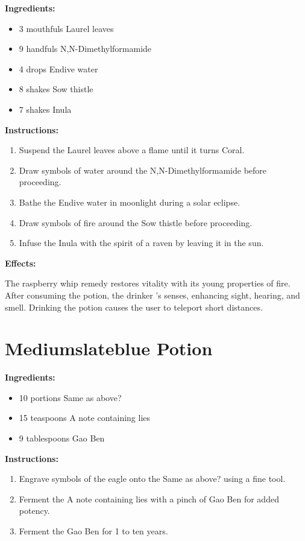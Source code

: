 \documentclass{article}
\begin{document}
\textbf{Ingredients:}

\begin{itemize}
  \item 3 mouthfuls Laurel leaves
  \item 9 handfuls N,N-Dimethylformamide
  \item 4 drops Endive water
  \item 8 shakes Sow thistle
  \item 7 shakes Inula
\end{itemize}

\textbf{Instructions:}

\begin{enumerate}
  \item Suspend the Laurel leaves above a flame until it turns Coral.
  \item Draw symbols of water around the N,N-Dimethylformamide before proceeding.
  \item Bathe the Endive water in moonlight during a solar eclipse.
  \item Draw symbols of fire around the Sow thistle before proceeding.
  \item Infuse the Inula with the spirit of a raven by leaving it in the sun.
\end{enumerate}

\textbf{Effects:}

The raspberry whip remedy restores vitality with its young properties of fire. After consuming the potion, the drinker 's senses, enhancing sight, hearing, and smell. Drinking the potion causes the user to teleport short distances.

\newpage
\section*{Mediumslateblue Potion}

\textbf{Ingredients:}

\begin{itemize}
  \item 10 portions Same as above?
  \item 15 teaspoons A note containing lies
  \item 9 tablespoons Gao Ben
\end{itemize}

\textbf{Instructions:}

\begin{enumerate}
  \item Engrave symbols of the eagle onto the Same as above? using a fine tool.
  \item Ferment the A note containing lies with a pinch of Gao Ben for added potency.
  \item Ferment the Gao Ben for 1 to ten years.
\end{enumerate}
\end{document}
